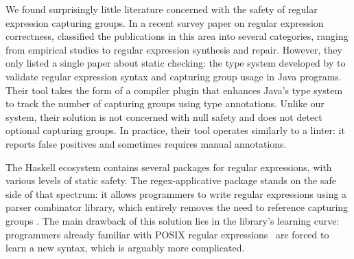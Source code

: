 We found surprisingly little literature concerned with the safety of regular expression capturing groups.
In a recent survey paper on regular expression correctness, \citet{li2021ensuring} classified the publications in this area into several categories, ranging from empirical studies to regular expression synthesis and repair.
However, they only listed a single paper about static checking: the type system developed by \citet{spishak2012type} to validate regular expression syntax and capturing group usage in Java programs.
Their tool takes the form of a compiler plugin that enhances Java's type system to track the number of capturing groups using type annotations.
Unlike our system, their solution is not concerned with null safety and does not detect optional capturing groups.
In practice, their tool operates similarly to a linter: it reports false positives and sometimes requires manual annotations.

The Haskell ecosystem contains several packages for regular expressions, with various levels of static safety.
The regex-applicative package stands on the safe side of that spectrum: it allows programmers to write regular expressions using a parser combinator library, which entirely removes the need to reference capturing groups \citep{cheplyaka2011regex}.
The main drawback of this solution lies in the library's learning curve: programmers already familiar with POSIX regular expressions~\citep{ieee2018the} are forced to learn a new syntax, which is arguably more complicated.


